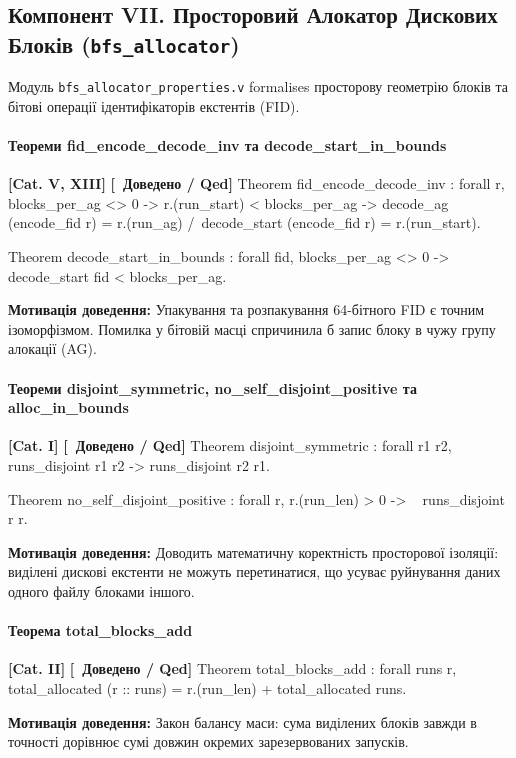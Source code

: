 \documentclass{article}
\let\originalfootnotesize\footnotesize
\let\oldverbatim\verbatim
\let\oldendverbatim\endverbatim
\renewenvironment{verbatim}{\originalfootnotesize\oldverbatim}{\oldendverbatim}
\newcommand{\thmcategory}[1]{{\small\textbf{\color{coreblue}[#1]}}}
\newcommand{\thmproven}{{\small\textbf{\color{productgreen}[\checkmark\ Доведено / Qed]}}}
\newcommand{\thmmotivation}[1]{%
  \par\smallskip\noindent\colorbox{boxbg}{\parbox{\dimexpr\linewidth-2\fboxsep\relax}{%
    \small\textbf{Мотивація доведення:} #1%
  }}\par\medskip
}
\begin{document}
\subsection[Компонент VII. Просторовий Алокатор]{Компонент VII. Просторовий Алокатор Дискових Блоків (\texttt{bfs\_allocator})}

Модуль \texttt{bfs\_allocator\_properties.v} formalises просторову геометрію блоків та бітові операції ідентифікаторів екстентів (FID).

\paragraph{Теореми fid\_encode\_decode\_inv та decode\_start\_in\_bounds} \thmcategory{Cat. V, XIII} \thmproven
\begin{verbatim}
Theorem fid_encode_decode_inv : forall r,
  blocks_per_ag <> 0 ->
  r.(run_start) < blocks_per_ag ->
  decode_ag (encode_fid r) = r.(run_ag) /\
  decode_start (encode_fid r) = r.(run_start).

Theorem decode_start_in_bounds : forall fid,
  blocks_per_ag <> 0 ->
  decode_start fid < blocks_per_ag.
\end{verbatim}
\thmmotivation{Упакування та розпакування 64-бітного FID є точним ізоморфізмом. Помилка у бітовій масці спричинила б запис блоку в чужу групу алокації (AG).}

\paragraph{Теореми disjoint\_symmetric, no\_self\_disjoint\_positive та alloc\_in\_bounds} \thmcategory{Cat. I} \thmproven
\begin{verbatim}
Theorem disjoint_symmetric : forall r1 r2,
  runs_disjoint r1 r2 -> runs_disjoint r2 r1.

Theorem no_self_disjoint_positive : forall r,
  r.(run_len) > 0 -> ~ runs_disjoint r r.
\end{verbatim}
\thmmotivation{Доводить математичну коректність просторової ізоляції: виділені дискові екстенти не можуть перетинатися, що усуває руйнування даних одного файлу блоками іншого.}

\paragraph{Теорема total\_blocks\_add} \thmcategory{Cat. II} \thmproven
\begin{verbatim}
Theorem total_blocks_add : forall runs r,
  total_allocated (r :: runs) = r.(run_len) + total_allocated runs.
\end{verbatim}
\thmmotivation{Закон балансу маси: сума виділених блоків завжди в точності дорівнює сумі довжин окремих зарезервованих запусків.}
\end{document}
